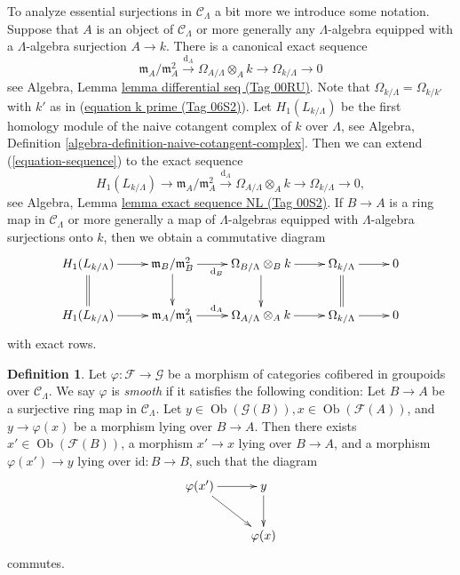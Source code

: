 \documentclass{amsart}
\theoremstyle{plain}
\theoremstyle{definition}
\newtheorem{definition}[subsection]{Definition}
\theoremstyle{remark}
\numberwithin{equation}{subsection}
\def\Ob{\mathop{\mathrm{Ob}}\nolimits}
\begin{document}
\noindent
To analyze essential surjections in $\mathcal{C}_\Lambda$ a bit more
we introduce some notation. Suppose that $A$ is an object
of $\mathcal{C}_\Lambda$ or more generally any $\Lambda$-algebra
equipped with a $\Lambda$-algebra surjection $A \to k$.
There is a canonical exact sequence
\begin{equation}
\label{equation-sequence}
\mathfrak m_A/\mathfrak m_A^2 \xrightarrow{\text{d}_A}
\Omega_{A/\Lambda} \otimes_A k \to
\Omega_{k/\Lambda} \to 0
\end{equation}
see
Algebra, Lemma \href{https://stacks.math.columbia.edu/tag/00RU}{lemma differential seq (Tag 00RU)}.
Note that $\Omega_{k/\Lambda} = \Omega_{k/k'}$ with $k'$ as
in (\href{https://stacks.math.columbia.edu/tag/06S2}{equation k prime (Tag 06S2)}). Let $H_1(L_{k/\Lambda})$
be the first homology module of the naive cotangent complex of $k$
over $\Lambda$, see
Algebra, Definition \ref{algebra-definition-naive-cotangent-complex}.
Then we can extend (\ref{equation-sequence})
to the exact sequence
\begin{equation}
\label{equation-sequence-extended}
H_1(L_{k/\Lambda}) \to
\mathfrak m_A/\mathfrak m_A^2 \xrightarrow{\text{d}_A}
\Omega_{A/\Lambda} \otimes_A k \to
\Omega_{k/\Lambda} \to 0,
\end{equation}
see
Algebra, Lemma \href{https://stacks.math.columbia.edu/tag/00S2}{lemma exact sequence NL (Tag 00S2)}.
If $B \to A$ is a ring map in $\mathcal{C}_\Lambda$
or more generally a map of $\Lambda$-algebras equipped
with $\Lambda$-algebra surjections onto $k$, then we obtain a
commutative diagram
\begin{equation}
\label{equation-sequence-functorial}
\vcenter{
\xymatrix{
H_1(L_{k/\Lambda}) \ar[r] \ar@{=}[d] &
\mathfrak m_B/\mathfrak m_B^2 \ar[r]_{\text{d}_B} \ar[d] &
\Omega_{B/\Lambda} \otimes_B k \ar[r] \ar[d] &
\Omega_{k/\Lambda} \ar[r] \ar@{=}[d] & 0 \\
H_1(L_{k/\Lambda}) \ar[r] &
\mathfrak m_A/\mathfrak m_A^2 \ar[r]^{\text{d}_A} &
\Omega_{A/\Lambda} \otimes_A k \ar[r] &
\Omega_{k/\Lambda} \ar[r] & 0
}
}
\end{equation}
with exact rows.

\begin{definition}
\label{definition-smooth-morphism}
Let $\varphi : \mathcal{F} \to \mathcal{G}$ be a morphism of categories
cofibered in groupoids over $\mathcal{C}_\Lambda$.  We say  $\varphi$ is
{\it smooth} if it satisfies the following condition: Let $B \to A$ be
a surjective ring map in $\mathcal{C}_\Lambda$.  Let $y \in
\Ob(\mathcal{G}(B)), x \in \Ob(\mathcal{F}(A))$, and $y
\to \varphi(x)$ be a morphism lying over $B \to A$.  Then there
exists $x' \in \Ob(\mathcal{F}(B))$, a morphism $x' \to x$
lying over $B \to A$, and a morphism $\varphi(x') \to y$ lying
over $\text{id}: B \to B$, such that the diagram
$$
\xymatrix{
\varphi(x') \ar[r] \ar[dr] & y \ar[d] \\
& \varphi(x)
}
$$
commutes.
\end{definition}
\end{document}
